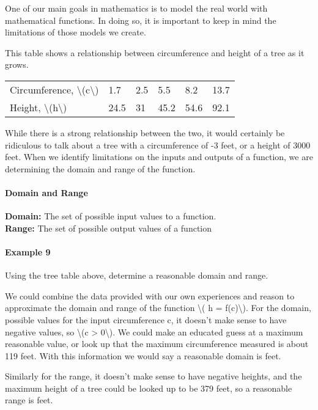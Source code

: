 One of our main goals in mathematics is to model the real world with
mathematical functions. In doing so, it is important to keep in mind the
limitations of those models we create.

This table shows a relationship between circumference and height of a
tree as it grows.

\begin{longtable}[]{@{}llllll@{}}
\toprule
\endhead
Circumference, \textbackslash{}(c\textbackslash{}) & 1.7 & 2.5 & 5.5 &
8.2 & 13.7\tabularnewline
Height, \textbackslash{}(h\textbackslash{}) & 24.5 & 31 & 45.2 & 54.6 &
92.1\tabularnewline
\bottomrule
\end{longtable}

While there is a strong relationship between the two, it would certainly
be ridiculous to talk about a tree with a circumference of -3 feet, or a
height of 3000 feet. When we identify limitations on the inputs and
outputs of a function, we are determining the domain and range of the
function.

\hypertarget{domain-and-range}{%
\paragraph{Domain and Range}\label{domain-and-range}}

\textbf{Domain:} The set of possible input values to a function.\\
\textbf{Range:} The set of possible output values of a function

\hypertarget{example-9}{%
\paragraph{Example 9}\label{example-9}}

Using the tree table above, determine a reasonable domain and range.

We could combine the data provided with our own experiences and reason
to approximate the domain and range of the function \textbackslash{}( h
= f(c)\textbackslash{}). For the domain, possible values for the input
circumference c, it doesn't make sense to have negative values, so
\textbackslash{}(c \textgreater{} 0\textbackslash{}). We could make an
educated guess at a maximum reasonable value, or look up that the
maximum circumference measured is about 119 feet. With this information
we would say a reasonable domain is feet.

Similarly for the range, it doesn't make sense to have negative heights,
and the maximum height of a tree could be looked up to be 379 feet, so a
reasonable range is feet.

